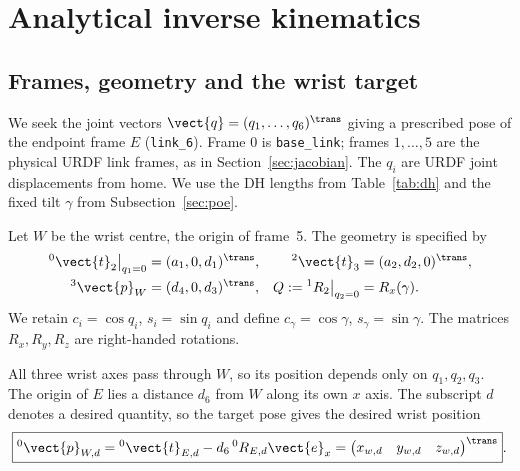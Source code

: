 \section{Analytical inverse kinematics}
\label{sec:analytical-ik}

\subsection{Frames, geometry and the wrist target}
\label{sec:ik-position}
We seek the joint vectors $\vect{q}=(q_1,\ldots,q_6)^\trans$ giving a prescribed pose
of the endpoint frame $E$ (\texttt{link\_6}). Frame $0$ is \texttt{base\_link}; frames $1,\ldots,5$
are the physical URDF link frames, as in Section~\ref{sec:jacobian}.
The $q_i$ are URDF joint displacements from home. We use the DH lengths
from Table~\ref{tab:dh} and the fixed tilt $\gamma$ from Subsection~\ref{sec:poe}.

Let $W$ be the wrist centre, the origin of frame~5. The geometry is specified by
\begin{equation}
 \begin{aligned}
 {}^0\vect{t}_2\big|_{q_1=0}&=(a_1,0,d_1)^\trans,
 &{}^2\vect{t}_3&=(a_2,d_2,0)^\trans,\\
 {}^3\vect{p}_W&=(d_4,0,d_3)^\trans,
 &Q:={}^{1}R_2\big|_{q_2=0}&=R_x(\gamma).
 \end{aligned}
 \label{eq:ik-geometry}
\end{equation}
We retain $c_i=\cos q_i$, $s_i=\sin q_i$ and define
$c_\gamma=\cos\gamma$, $s_\gamma=\sin\gamma$.
The matrices $R_x,R_y,R_z$ are right-handed rotations.

All three wrist axes pass through $W$, so its position depends only on
$q_1,q_2,q_3$. The origin of $E$ lies a distance $d_6$ from $W$ along
its own $x$ axis. The subscript $d$ denotes a desired quantity, so the target
pose gives the desired wrist position
\begin{equation}
 \boxed{{}^0\vect{p}_{W,d}={}^0\vect{t}_{E,d}-d_6\,{}^0R_{E,d}\vect{e}_x
       =\begin{pmatrix}x_{w,d}&y_{w,d}&z_{w,d}\end{pmatrix}^{\trans}}.
 \label{eq:ik-wrist-target}
\end{equation}

